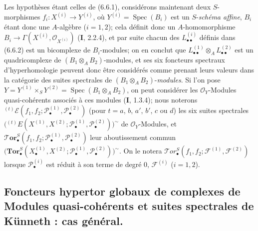 \begin{env}[6.6.8]
Les hypothèses étant celles de (6.6.1), considérons maintenant deux
$S$-morphismes $f_i:X^{(i)}\to Y^{(i)}$, où
$Y^{(i)}=\operatorname{Spec}(B_i)$ est un $S$-\emph{schéma affine}, $B_i$
étant donc une $A$-algèbre ($i=1,2$); cela définit donc un $A$-homomorphisme
$B_i\to\Gamma(X^{(i)},\mathscr O_{X^{(i)}})$ (\textbf{I}, 2.2.4), et par suite chacun
des $L_{\bullet\bullet}^{(i)}$ définis dans (6.6.2) est un bicomplexe de
$B_i$-modules; on en conclut que
$L_{\bullet\bullet}^{(1)}\otimes_A L_{\bullet\bullet}^{(2)}$ est un
quadricomplexe de $(B_1\otimes_A B_2)$-modules, et ses six foncteurs spectraux
d'hyperhomologie peuvent donc être considérés comme prenant leurs valeurs
dans la catégorie des suites spectrales de $(B_1\otimes_A B_2)$-\emph{modules}. Si
l'on pose
$Y=Y^{(1)}\times_S Y^{(2)}=\operatorname{Spec}(B_1\otimes_A B_2)$, on peut
considérer les $\mathscr O_Y$-Modules quasi-cohérents associés à ces modules
(\textbf{I}, 1.3.4); nous noterons
${}^{(t)}\mathscr E
(f_1,f_2;\mathscr P_\bullet^{(1)},\mathscr P_\bullet^{(2)})$
(pour $t=a$, $b$, $a'$, $b'$, $c$ ou $d$) les six suites spectrales
$
  \bigl({}^{(t)}E
  (X^{(1)},X^{(2)};
   \mathscr P_\bullet^{(1)},\mathscr P_\bullet^{(2)})\bigr)^{\sim}$
de $\mathscr O_Y$-Modules, et
$\boldsymbol{\mathscr{T}\!or}_\bullet^S
(f_1,f_2;\mathscr P_\bullet^{(1)},\mathscr P_\bullet^{(2)})$ leur
aboutissement commun
$
  \bigl(\mathbf{Tor}_\bullet^S
  (X_\bullet^{(1)},X^{(2)};
   \mathscr P_\bullet^{(1)},\mathscr P_\bullet^{(2)})\bigr)^{\sim}$.
On le notera
$\mathscr{T}\!or_\bullet^S(f_1,f_2;\mathscr F^{(1)},\mathscr F^{(2)})$
lorsque $\mathscr P_\bullet^{(i)}$ est réduit à son terme de degré 0,
$\mathscr F^{(i)}$ ($i=1,2$).
\end{env}

\subsection{Foncteurs hypertor globaux de complexes de Modules quasi-cohérents
et suites spectrales de Künneth : cas général.}

